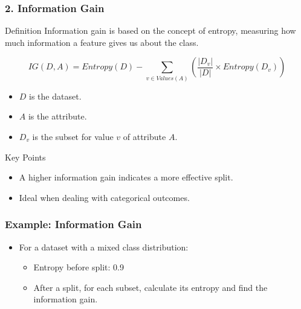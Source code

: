 \documentclass[aspectratio=169]{beamer}
\begin{document}
\begin{frame}[fragile]
    \frametitle{2. Information Gain}

    \begin{block}{Definition}
        Information gain is based on the concept of entropy, measuring how much information a feature gives us about the class.
    \end{block}

    \begin{equation}
        IG(D, A) = Entropy(D) - \sum_{v \in Values(A)} \left( \frac{|D_v|}{|D|} \times Entropy(D_v) \right)
    \end{equation}

    \begin{itemize}
        \item \( D \) is the dataset.
        \item \( A \) is the attribute.
        \item \( D_v \) is the subset for value \( v \) of attribute \( A \).
    \end{itemize}

    \begin{block}{Key Points}
        \begin{itemize}
            \item A higher information gain indicates a more effective split.
            \item Ideal when dealing with categorical outcomes.
        \end{itemize}
    \end{block}
    
\end{frame}

\begin{frame}[fragile]
    \frametitle{Example: Information Gain}

    \begin{itemize}
        \item For a dataset with a mixed class distribution:
        \begin{itemize}
            \item Entropy before split: 0.9
            \item After a split, for each subset, calculate its entropy and find the information gain.
        \end{itemize}
    \end{itemize}

\end{frame}
\end{document}
